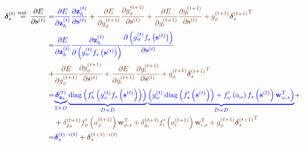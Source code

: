 \documentclass[11pt]{article}
\DeclareMathOperator{\diag}{diag}
\begin{document}
\begin{equation}
  \begin{split}
    \boldsymbol{\delta}_{s}^{(t)} \overset{not.}{=} \dfrac{\partial
      E}{\partial \mathbf{s}^{(t)}} = & {\color{blue}
      \dfrac{\partial E}{\partial \mathbf{z}_h^{(t)}}
      \dfrac{\partial \mathbf{z}_h^{(t)}}{\partial
        \mathbf{s}^{(t)}}} + {\color{auburn}\dfrac{\partial
        E}{\partial g_{\phi}^{(t+1)}} \dfrac{\partial
        g_{\phi}^{(t+1)}}{\partial \mathbf{s}^{(t)}} +
      \dfrac{\partial E}{\partial g_{\iota}^{(t+1)}} \dfrac{\partial
        g_{\iota}^{(t+1)}}{\partial \mathbf{s}^{(t)}}
     +
       g_{\phi}^{(t+1)}{\boldsymbol{\delta}_{s}^{(t+1)}}^{\text{T}}}
    \\
    = & {\color{blue}
      \dfrac{\partial E}{\partial \mathbf{z}_h^{(t)}}
      \dfrac{\partial \mathbf{z}_h^{(t)}}{\partial
        \left(g_w^{(t)} f_s \left(\mathbf{s}^{(t)} \right) \right)}
      \dfrac{\partial
        \left(g_w^{(t)} f_s\left(\mathbf{s}^{(t)} \right)\right)}
      {\partial \mathbf{s}^{(t)}}
    } \\ + & {\color{auburn}\dfrac{\partial
      E}{\partial g_{\phi}^{(t+1)}} \dfrac{\partial
      g_{\phi}^{(t+1)}}{\partial \mathbf{s}^{(t)}} +
    \dfrac{\partial E}{\partial g_{\iota}^{(t+1)}} \dfrac{\partial
      g_{\iota}^{(t+1)}}{\partial \mathbf{s}^{(t)}}
     +
       g_{\phi}^{(t+1)}{\boldsymbol{\delta}_{s}^{(t+1)}}^{\text{T}}}
  \\
  = & {\color{blue}
    \underbrace{\boldsymbol{\delta}_{\mathbf{z}_h}^{(t)}}_{1\times D}
    \underbrace{\diag\left(f_{h}'\left(g_{\omega}^{(t)} f_s\left(\mathbf{s}^{(t)}\right)\right)\right)}_{D\times D}
    \underbrace{\left( g_{\omega}^{(t)} \diag\left(f_s'\left(\mathbf{s}^{(t)}\right) \right) + f'_{\omega}\left(a_{\omega} \right) f_s\left(\mathbf{s}^{(t)}\right)\mathbf{w}^{\text{T}}_{\omega, s} \right) }_{D \times D}} + \\
     & +
     {\color{auburn}\delta_{g_{\phi}}^{(t+1)}f_{\phi}'\left(a_{\phi}^{(t+1)}\right)\mathbf{w}_{\phi,
         s}^{\text{T}} +
       \delta_{g_{\iota}}^{(t+1)}f_{\iota}'\left(a_{\iota}^{(t+1)}\right)\mathbf{w}_{\iota,
         s}^{\text{T}} +
       g_{\phi}^{(t+1)}{\boldsymbol{\delta}_{s}^{(t+1)}}^{\text{T}}} \\
     = & {\color{blue}\boldsymbol{\delta}^{(t) \rightarrow (t)}_s} +
     {\color{auburn}\boldsymbol{\delta}^{(t+1) \rightarrow (t)}_s}
  \end{split}
\end{equation}
\end{document}
